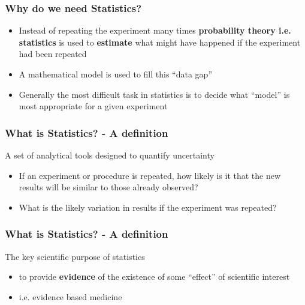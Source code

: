 \documentclass{beamer}\usepackage[]{graphicx}\usepackage[]{color}
\begin{document}
{{{%

\begin{frame}
\frametitle{Why do we need Statistics?}
\begin{itemize}
\setlength\itemsep{1.5em}
\item Instead of repeating the experiment many times {\bfseries probability
theory i.e. statistics} is used to {\bfseries estimate} what might have happened
if the experiment had been repeated
\item A mathematical model is used to fill this ``data gap''
\item Generally the most difficult task in statistics is to decide what ``model''
is most appropriate for a given experiment
\end{itemize}
\vspace{0.5cm}
\end{frame}


\begin{frame}
\frametitle{What is Statistics? - A definition}
A set of analytical tools designed to quantify uncertainty
\vspace{0.3cm}
\begin{itemize}
\setlength\itemsep{1.5em}
\item If an experiment or procedure is repeated, how likely is it that the new
results will be similar to those already observed?
\item What is the likely variation in results if the experiment was repeated?
\end{itemize}\vspace{0.5cm}
\end{frame}


\begin{frame}
\frametitle{What is Statistics? - A definition}
The key scientific purpose of statistics
\vspace{0.5cm}
\begin{itemize}
\setlength\itemsep{1.5em}
\item to provide {\bfseries evidence} of the existence of some ``effect'' of
scientific interest
\item i.e. evidence based medicine
\end{itemize}
\vspace{0.5cm}
\end{frame}

}}}
\end{document}
